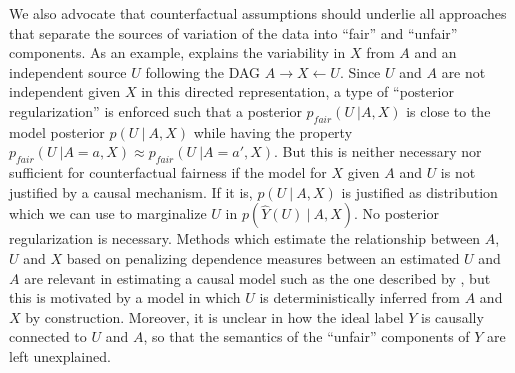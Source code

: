 We also advocate that counterfactual assumptions should underlie all
approaches that separate the sources of variation of the data into
``fair'' and ``unfair'' components. As an example,
\citet{louizos2015variational} explains the variability in $X$ from
$A$ and an independent source $U$ following the DAG
$A \rightarrow X \leftarrow U$. Since $U$ and $A$ are not independent
given $X$ in this directed representation, a type of ``posterior
regularization'' \citep{ganchev:10} is enforced such that a posterior
$p_{fair}(U\ | A, X)$ is close to the model posterior $p(U\ |\ A, X)$
while having the property
$p_{fair}(U\ | A = a, X) \approx p_{fair}(U\ | A = a', X)$. But this
is neither necessary nor sufficient for counterfactual fairness if the
model for $X$ given $A$ and $U$ is not justified by a causal
mechanism. If it is, $p(U\ |\ A, X)$ is justified as distribution
which we can use to marginalize $U$ in $p(\hat Y(U)\ |\ A, X)$. No
posterior regularization is necessary.  Methods which estimate the
relationship between $A$, $U$ and $X$ based on penalizing dependence
measures between an estimated $U$ and $A$ are relevant in estimating a
causal model such as the one described by \citet{mooij:09}, but this
is motivated by a model in which $U$ is deterministically inferred
from $A$ and $X$ by construction. Moreover, it is unclear in
\citet{louizos2015variational} how the ideal label $Y$ is causally
connected to $U$ and $A$, so that the semantics of the ``unfair''
components of $Y$ are left unexplained.


